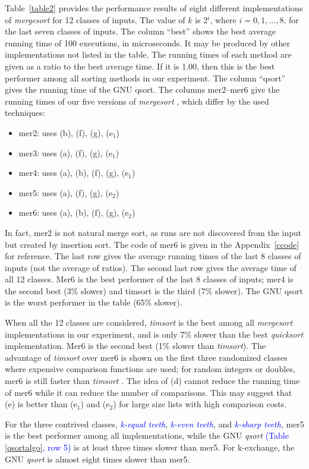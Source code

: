\documentclass[AMA,STIX1COL]{WileyNJD-v2}
\newcommand{\keq}{\textcolor{blue}{\emph{k-equal teeth}}}
\newcommand{\kev}{\textcolor{blue}{\emph{k-even teeth}}}
\newcommand{\ksha}{\textcolor{blue}{\emph{k-sharp teeth}}}
\newcommand{\qusort}{\emph{quicksort }}
\newcommand{\qsort}{\emph{qsort }}
\newcommand{\tsort}{\emph{timsort }}
\newcommand{\tsortn}{\emph{timsort}}
\newcommand{\msort}{\emph{mergesort }}
\begin{document}
Table~\ref{table2} provides the performance results of eight different implementations of \msort for 12 classes of inputs. The value of $k$ is 2$^i$, where $i = 0, 1, ..., 8$, for the last seven classes of inputs. The column “best” shows the best average running time of 100 executions, in microseconds. It may be produced by other implementations not listed in the table. The running times of each method are given as a ratio to the best average time. If it is 1.00, then this is the best performer among all sorting methods in our experiment. The column “qsort” gives the running time of the GNU qsort. The columns mer2–mer6 give the running times of our five versions of \msort, which differ by the used techniques:
\begin{itemize}
\item mer2: uses (b), (f), (g), (e$_1$)
\item mer3: uses (a), (f), (g), (e$_1$)
\item mer4: uses (a), (b), (f), (g), (e$_1$)
\item mer5: uses (a), (f), (g), (e$_2$)
\item mer6: uses (a), (b), (f), (g), (e$_2$)
\end{itemize}

In fact, mer2 is not natural merge sort, as runs are not discovered from the input but created by insertion sort. 
The code of mer6 is given in the Appendix~\ref{ccode} for reference.  
The last row gives the average running times of the last 8 classes of inputs (not the average of ratios). 
The second last row gives the average time of all 12 classes. 
Mer6 is the best performer of the last 8 classes of inputs; mer4 is the second best (3\% slower) and timsort is the third (7\% slower). 
The GNU qsort is the worst performer in the table (65\% slower).

When all the 12 classes are considered, \tsort is the best among all \msort implementations in our experiment, and is only 7\% slower than the best \qusort implementation. Mer6 is the second best (1\% slower than \tsortn). 
The advantage of \tsort over mer6 is shown on the first three randomized classes where expensive comparison functions are used; for random integers or doubles, mer6 is still faster than \tsort. 
The idea of (d) cannot reduce the running time of mer6 while it can reduce the number of comparisons. 
This may suggest that (e) is better than (e$_1$) and (e$_2$) for large size lists with high comparison costs. 

For the three contrived classes, \keq, \kev, and \ksha, mer5 is the best performer among all implementations, while the GNU \qsort\textcolor{blue}{(Table \ref{qsortalgo}, row 5)} is at least three times slower than mer5. 
For k-exchange, the GNU \qsort is almost eight times slower than mer5.  
\end{document}

